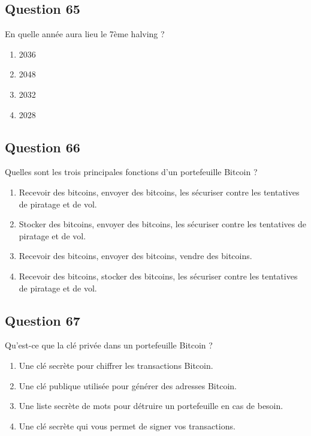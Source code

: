 \documentclass[12pt,a4paper]{article}
\begin{document}
\bigskip


\subsection*{Question 65}
En quelle année aura lieu le 7ème halving ?

\begin{enumerate}[label=\Alph*., leftmargin=*]
\item 2036
\item 2048
\item 2032
\item 2028
\end{enumerate}

\bigskip


\subsection*{Question 66}
Quelles sont les trois principales fonctions d'un portefeuille Bitcoin ?

\begin{enumerate}[label=\Alph*., leftmargin=*]
\item Recevoir des bitcoins, envoyer des bitcoins, les sécuriser contre les tentatives de piratage et de vol.
\item Stocker des bitcoins, envoyer des bitcoins, les sécuriser contre les tentatives de piratage et de vol.
\item Recevoir des bitcoins, envoyer des bitcoins, vendre des bitcoins.
\item Recevoir des bitcoins, stocker des bitcoins, les sécuriser contre les tentatives de piratage et de vol.
\end{enumerate}

\bigskip


\subsection*{Question 67}
Qu'est-ce que la clé privée dans un portefeuille Bitcoin ?

\begin{enumerate}[label=\Alph*., leftmargin=*]
\item Une clé secrète pour chiffrer les transactions Bitcoin.
\item Une clé publique utilisée pour générer des adresses Bitcoin.
\item Une liste secrète de mots pour détruire un portefeuille en cas de besoin.
\item Une clé secrète qui vous permet de signer vos transactions.
\end{enumerate}
\end{document}
